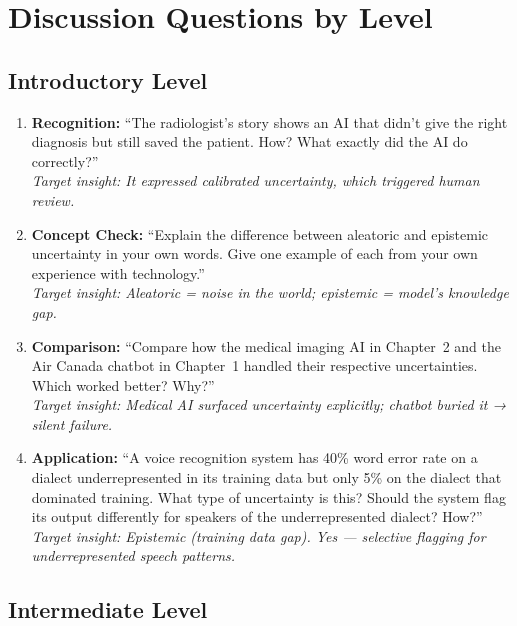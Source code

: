 \section{Discussion Questions by Level}

\subsection{Introductory Level}

\begin{enumerate}
    \item \textbf{Recognition:} ``The radiologist's story shows an AI that didn't give the right diagnosis but still saved the patient. How? What exactly did the AI do correctly?''\\
    \textit{Target insight: It expressed calibrated uncertainty, which triggered human review.}

    \item \textbf{Concept Check:} ``Explain the difference between aleatoric and epistemic uncertainty in your own words. Give one example of each from your own experience with technology.''\\
    \textit{Target insight: Aleatoric = noise in the world; epistemic = model's knowledge gap.}

    \item \textbf{Comparison:} ``Compare how the medical imaging AI in Chapter~2 and the Air Canada chatbot in Chapter~1 handled their respective uncertainties. Which worked better? Why?''\\
    \textit{Target insight: Medical AI surfaced uncertainty explicitly; chatbot buried it → silent failure.}

    \item \textbf{Application:} ``A voice recognition system has 40\% word error rate on a dialect underrepresented in its training data but only 5\% on the dialect that dominated training. What type of uncertainty is this? Should the system flag its output differently for speakers of the underrepresented dialect? How?''\\
    \textit{Target insight: Epistemic (training data gap). Yes --- selective flagging for underrepresented speech patterns.}
\end{enumerate}

\subsection{Intermediate Level}

